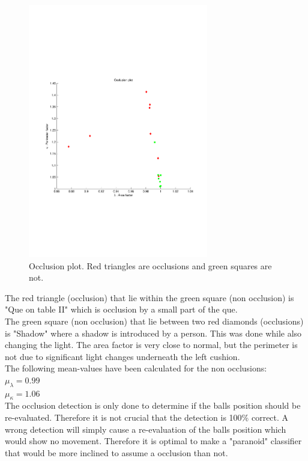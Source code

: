 \begin{figure}[H]
\begin{center}
\leavevmode
\includegraphics[width=0.7\textwidth]{images/occlusion_plot}
\end{center}
\caption{Occlusion plot. Red triangles are occlusions and green squares are not.}
\label{fig:occlusion_plot}
\end{figure}

The red triangle (occlusion) that lie within the green square (non occlusion) is "Que on table II" which is occlusion by a small part of the que.\\

The green square (non occlusion) that lie between two red diamonds (occlusions) is "Shadow" where a shadow is introduced by a person. This was done while also changing the light. The area factor is very close to normal, but the perimeter is not due to significant light changes underneath the left cushion.\\

The following mean-values have been calculated for the non occlusions:\\

$\mu_{\lambda} = 0.99$\\
$\mu_{\kappa} = 1.06$\\

The occlusion detection is only done to determine if the balls position should be re-evaluated. Therefore it is not crucial that the detection is 100\% correct. A wrong detection will simply cause a re-evaluation of the balls position which would show no movement. Therefore it is optimal to make a "paranoid" classifier that would be more inclined to assume a occlusion than not.\\

